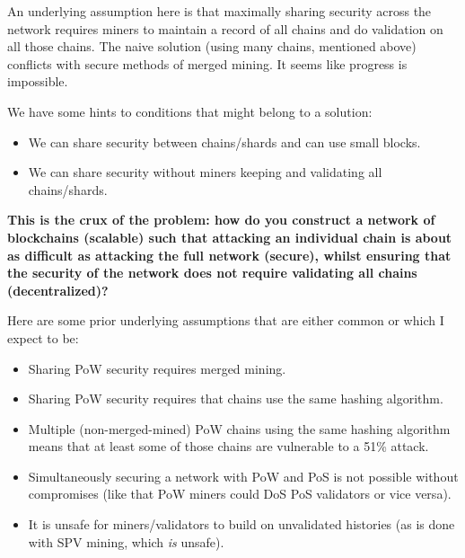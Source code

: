 An underlying assumption here is that maximally sharing security across the network requires miners to maintain a record of all chains and do validation on all those chains.
The naive solution (using many chains, mentioned above) conflicts with secure methods of merged mining.
It seems like progress is impossible.

We have some hints to conditions that might belong to a solution:

\begin{itemize}
  \item We can share security between chains/shards and can use small blocks.
  \item We can share security without miners keeping and validating all chains/shards.
\end{itemize}

\textbf{This is the crux of the problem: how do you construct a network of blockchains (scalable) such that attacking an individual chain is about as difficult as attacking the full network (secure), whilst ensuring that the security of the network does not require validating all chains (decentralized)?}


Here are some prior underlying assumptions that are either common or which I expect to be:

\begin{itemize}
  \item Sharing PoW security requires merged mining.
  \item Sharing PoW security requires that chains use the same hashing algorithm.
  \item Multiple (non-merged-mined) PoW chains using the same hashing algorithm means that at least some of those chains are vulnerable to a 51\% attack.
  \item Simultaneously securing a network with PoW and PoS is not possible without compromises (like that PoW miners could DoS PoS validators or vice versa).
  \item It is unsafe for miners/validators to build on unvalidated histories (as is done with SPV mining, which \emph{is} unsafe).
\end{itemize}

